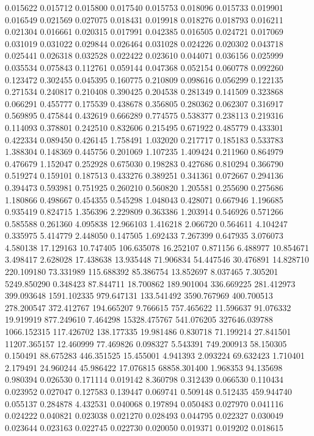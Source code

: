 0.015622
0.015712
0.015800
0.017540
0.015753
0.018096
0.015733
0.019901
0.016549
0.021569
0.027075
0.018431
0.019918
0.018276
0.018793
0.016211
0.021304
0.016661
0.020315
0.017991
0.042385
0.016505
0.024721
0.017069
0.031019
0.031022
0.029844
0.026464
0.031028
0.024226
0.020302
0.043718
0.025441
0.026318
0.032528
0.022422
0.023610
0.044071
0.036156
0.025999
0.035534
0.075843
0.112761
0.059144
0.047368
0.052154
0.060778
0.092260
0.123472
0.302455
0.045395
0.160775
0.210809
0.098616
0.056299
0.122135
0.271534
0.240817
0.210408
0.390425
0.204538
0.281349
0.141509
0.323868
0.066291
0.455777
0.175539
0.438678
0.356805
0.280362
0.062307
0.316917
0.569895
0.475844
0.432619
0.666289
0.774575
0.538377
0.238113
0.219316
0.114093
0.378801
0.242510
0.832606
0.215495
0.671922
0.485779
0.433301
0.422334
0.089450
0.426145
1.758491
1.032020
0.217717
0.185183
0.533783
1.388304
0.148369
0.445756
0.201069
1.107235
1.409424
0.211960
0.864979
0.476679
1.152047
0.252928
0.675030
0.198283
0.427686
0.810294
0.366790
0.519274
0.159101
0.187513
0.433276
0.389251
0.341361
0.072667
0.294136
0.394473
0.593981
0.751925
0.260210
0.560820
1.205581
0.255690
0.275686
1.180866
0.498667
0.454355
0.545298
1.048043
0.428071
0.667946
1.196685
0.935419
0.824715
1.356396
2.229809
0.363386
1.203914
0.546926
0.571266
0.585588
0.261360
4.095838
12.966103
1.416218
2.066720
0.564611
4.104247
0.335975
5.414779
2.448050
0.147505
1.692433
7.267399
0.647935
3.076073
4.580138
17.129163
10.747405
106.635078
16.252107
0.871156
6.488977
10.854671
3.498417
2.628028
17.438638
13.935448
71.906834
54.447546
30.476891
14.828710
220.109180
73.331989
115.688392
85.386754
13.852697
8.037465
7.305201
5249.850290
0.348423
87.844711
18.700862
189.901004
336.669225
281.412973
399.093648
1591.102335
979.647131
133.541492
3590.767969
400.700513
278.200547
372.412767
194.665207
9.766615
757.465622
11.596637
91.076332
19.919919
877.249610
7.464298
15328.475767
541.076205
327646.039788
1066.152315
117.426702
138.177335
19.981486
0.830718
71.199214
27.841501
11207.365157
12.460999
77.469826
0.098327
5.543391
749.200913
58.150305
0.150491
88.675283
446.351525
15.455001
4.941393
2.093224
69.632423
1.710401
2.179491
24.960244
45.986422
17.076815
68858.301400
1.968353
94.135698
0.980394
0.026530
0.171114
0.019142
8.360798
0.312439
0.066530
0.110434
0.023952
0.027047
0.127583
0.139447
0.069741
0.509148
0.512435
459.944740
0.055137
0.284878
4.432531
0.040068
0.197894
0.050483
0.027970
0.041116
0.024222
0.040821
0.023038
0.021270
0.028493
0.044795
0.022327
0.030049
0.023644
0.023163
0.022745
0.022730
0.020050
0.019371
0.019202
0.018615
